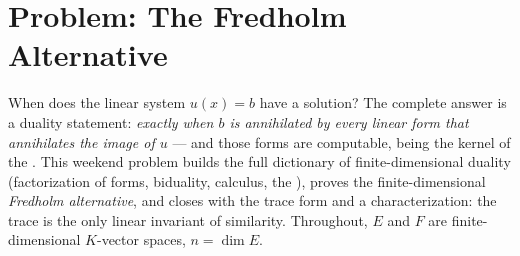 \section{Problem: The Fredholm Alternative}

When does the linear system $u(x) = b$ have a solution? The
complete answer is a duality statement: \emph{exactly when $b$ is
annihilated by every linear form that annihilates the image of
$u$} --- and those forms are computable, being the kernel of the
. This weekend problem builds the full dictionary of
finite-dimensional duality (factorization of forms, biduality,
 calculus, the ), proves the
finite-dimensional \emph{Fredholm alternative}, and closes with
the trace form and a characterization: the trace is the only
linear invariant of similarity. Throughout, $E$ and $F$ are
finite-dimensional $K$-vector spaces, $n = \dim E$.

